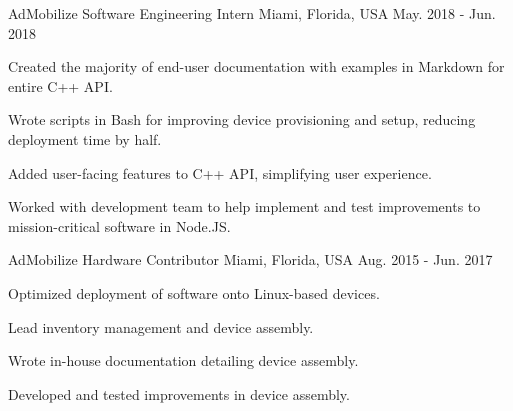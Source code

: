 \begin{cventries}

  \cventry
    {AdMobilize} %
    {Software Engineering Intern} %
    {Miami, Florida, USA} %
    {May. 2018 - Jun. 2018} %
    {
      \begin{cvitems} %
        \item {Created the majority of end-user documentation with examples in Markdown for entire C++ API.}
        \item {Wrote scripts in Bash for improving device provisioning and setup, reducing deployment time by half.}
        \item {Added user-facing features to C++ API, simplifying user experience.}
        \item {Worked with development team to help implement and test improvements to mission-critical software in Node.JS.}
      \end{cvitems}
    }

  \cventry
    {AdMobilize} %
    {Hardware Contributor} %
    {Miami, Florida, USA} %
    {Aug. 2015 - Jun. 2017} %
    {
      \begin{cvitems} %
        \item {Optimized deployment of software onto Linux-based devices.}
        \item {Lead inventory management and device assembly.}
        \item {Wrote in-house documentation detailing device assembly.}
        \item {Developed and tested improvements in device assembly.}
      \end{cvitems}
    }

\end{cventries}
